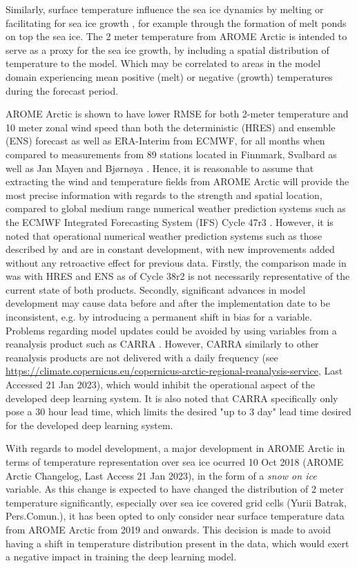 \documentclass[../main/thesis.tex]{subfiles}
\begin{document}
Similarly, surface temperature influence the sea ice dynamics by melting or facilitating for sea ice growth \citep{Hibler1979}, for example through the formation of melt ponds on top the sea ice. The 2 meter temperature from AROME Arctic is intended to serve as a proxy for the sea ice growth, by including a spatial distribution of temperature to the model. Which may be correlated to areas in the model domain experiencing mean positive (melt) or negative (growth) temperatures during the forecast period.

AROME Arctic is shown to have lower RMSE for both 2-meter temperature and 10 meter zonal wind speed than both the deterministic (HRES) and ensemble (ENS) forecast as well as ERA-Interim from ECMWF, for all months when compared to measurements from 89 stations located in Finnmark, Svalbard as well as Jan Mayen and Bjørnøya \citep{Mueller2017}. Hence, it is reasonable to assume that extracting the wind and temperature fields from AROME Arctic will provide the most precise information with regards to the strength and spatial location, compared to global medium range numerical weather prediction systems such as the ECMWF Integrated Forecasting System (IFS) Cycle 47r3 \citep{Haiden2022}. However, it is noted that operational numerical weather prediction systems such as those described by \citet{Mueller2017} and \citet{Haiden2022} are in constant development, with new improvements added without any retroactive effect for previous data. Firstly, the comparison made in \citet{Mueller2017} was with HRES and ENS as of Cycle 38r2 \cite{Bauer2013} is not necessarily representative of the current state of both products. Secondly, significant advances in model development may cause data before and after the implementation date to be inconsistent, e.g. by introducing a permanent shift in bias for a variable. Problems regarding model updates could be avoided by using variables from a reanalysis product such as CARRA \citep{Koeltzow2022}. However, CARRA similarly to other reanalysis products are not delivered with a daily frequency (see \url{https://climate.copernicus.eu/copernicus-arctic-regional-reanalysis-service}, Last Accessed 21 Jan 2023), which would inhibit the operational aspect of the developed deep learning system. It is also noted that CARRA specifically only pose a 30 hour lead time, which limits the desired "up to 3 day" lead time desired for the developed deep learning system.

With regards to model development, a major development in AROME Arctic in terms of temperature representation over sea ice ocurred 10 Oct 2018 (AROME Arctic Changelog, Last Access 21 Jan 2023), in the form of a \textit{snow on ice} variable. As this change is expected to have changed the distribution of 2 meter temperature significantly, especially over sea ice covered grid cells (Yurii Batrak, Pers.Comun.), it has been opted to only consider near surface temperature data from AROME Arctic from 2019 and onwards. This decision is made to avoid having a shift in temperature distribution present in the data, which would exert a negative impact in training the deep learning model.
\end{document}
